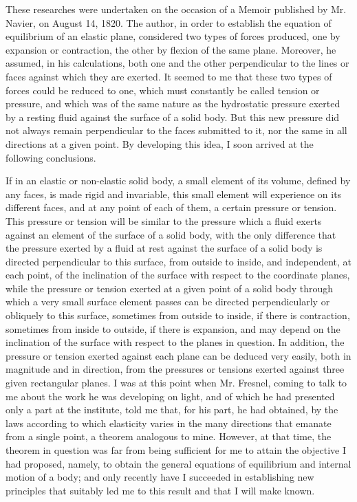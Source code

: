 \documentclass[leqno,openright,smallroyalvopaper,8pt,twoside,showtrims]{memoir}
\begin{document}
\vspace*{2cm} 
These researches were undertaken on the occasion of a Memoir published by Mr. Navier, on August 14, 1820. The author, in order to establish the equation of equilibrium of an elastic plane, considered two types of forces produced, one by expansion or contraction, the other by flexion of the same plane. Moreover, he assumed, in his calculations, both one and the other perpendicular to the lines or faces against which they are exerted. It seemed to me that these two types of forces could be reduced to one, which must constantly be called tension or pressure, and which was of the same nature as the hydrostatic pressure exerted by a resting fluid against the surface of a solid body. But this new pressure did not always remain perpendicular to the faces submitted to it, nor the same in all directions at a given point. By developing this idea, I soon arrived at the following conclusions. 

If in an elastic or non-elastic solid body, a small element of its volume, defined by any faces, is made rigid and invariable, this small element will experience on its different faces, and at any point of each of them, a certain pressure or tension. This pressure or tension will be similar to the pressure which a fluid exerts against an element of the surface of a solid body, with the only difference that the pressure exerted by a fluid at rest against the surface of a solid body is directed perpendicular to this surface, from outside to inside, and independent, at each point, of the inclination of the surface with respect to the coordinate planes, while the pressure or tension exerted at a given point of a solid body through which a very small surface element passes can be directed perpendicularly or obliquely to this surface, sometimes from outside to inside, if there is contraction, sometimes from inside to outside, if there is expansion, and may depend on the inclination of the surface with respect to the planes in question. In addition, the pressure or tension exerted against each plane can be deduced very easily, both in magnitude and in direction, from the pressures or tensions exerted against three given rectangular planes. I was at this point when Mr. Fresnel, coming to talk to me about the work he was developing on light, and of which he had presented only a part at the institute, told me that, for his part, he had obtained, by the laws according to which elasticity varies in the many directions that emanate from a single point, a theorem analogous to mine. However, at that time, the theorem in question was far from being sufficient for me to attain the objective I had proposed, namely, to obtain the general equations of equilibrium and internal motion of a body; and only recently have I  succeeded in establishing new principles that suitably led me to this result and that I will make known. 
\end{document}
